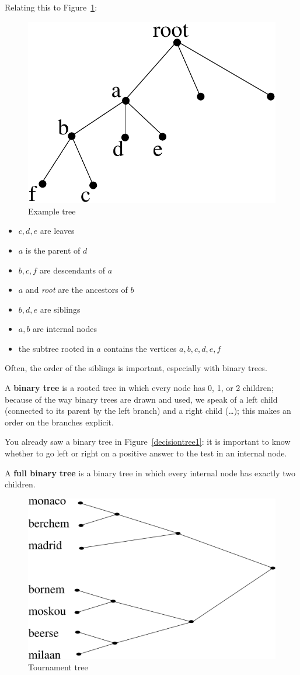 Relating this to Figure~\ref{boom1}:

\begin{figure}[ht]
\begin{center}
\includegraphics[width=0.25\linewidth,keepaspectratio]{boom1eng}
\end{center}
\caption{Example tree \label{boom1}}
\end{figure}

\begin{itemize}
\item
$c,d,e$ are leaves
\item
$a$ is the parent of $d$
\item
$b,c,f$ are descendants of $a$
\item
$a$ and {\em root} are the ancestors of $b$
\item
$b,d,e$ are siblings
\item
$a,b$ are internal nodes
\item
the subtree rooted in $a$ contains the vertices $a,b,c,d,e,f$
\end{itemize}

Often, the order of the siblings is important, especially with binary
trees.

 \begin{definition}
\textup{A \textbf{binary tree} is a rooted tree in which every node
has 0, 1, or 2 children; because of the way binary trees are drawn and
used, we speak of a left child (connected to its parent by the left
branch) and a right child (\ldots); this makes an order on the branches
explicit.  }
\end{definition}

You already saw a binary tree in Figure~\ref{decisiontree1}: it is
important to know whether to go left or right on a positive answer to
the test in an internal node.

 \begin{definition}
\textup{A \textbf{full binary tree} is a binary tree
in which every internal node has exactly two children.  }
\end{definition}

\begin{figure}[ht]
\begin{center}
\includegraphics[width=0.5\linewidth,keepaspectratio]{tornooi1}
\end{center}
\caption{Tournament tree \label{tornooi1}}
\end{figure}


